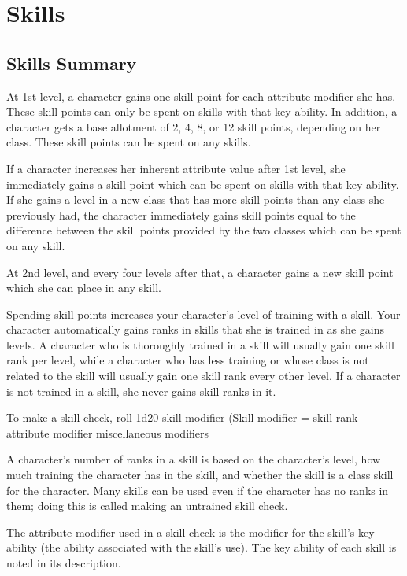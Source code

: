 \chapter{Skills}
 \section{Skills Summary}
  At 1st level, a character gains one skill point for each attribute modifier she has. These skill points can only be spent on skills with that key ability. In addition, a character gets a base allotment of 2, 4, 8, or 12 skill points, depending on her class. These skill points can be spent on any skills.

\par If a character increases her inherent attribute value after 1st level, she immediately gains a skill point which can be spent on skills with that key ability. If she gains a level in a new class that has more skill points than any class she previously had, the character immediately gains skill points equal to the difference between the skill points provided by the two classes which can be spent on any skill.

\par At 2nd level, and every four levels after that, a character gains a new skill point which she can place in any skill.

 Spending skill points increases your character's level of training with a skill. Your character automatically gains ranks in skills that she is trained in as she gains levels. A character who is thoroughly trained in a skill will usually gain one skill rank per level, while a character who has less training or whose class is not related to the skill will usually gain one skill rank every other level. If a character is not trained in a skill, she never gains skill ranks in it.

 To make a skill check, roll 1d20 \add skill modifier (Skill modifier = skill rank \add attribute modifier \add miscellaneous modifiers

 A character's number of ranks in a skill is based on the character's level, how much training the character has in the skill, and whether the skill is a class skill for the character. Many skills can be used even if the character has no ranks in them; doing this is called making an untrained skill check.

 The attribute modifier used in a skill check is the modifier for the skill's key ability (the ability associated with the skill's use). The key ability of each skill is noted in its description.

